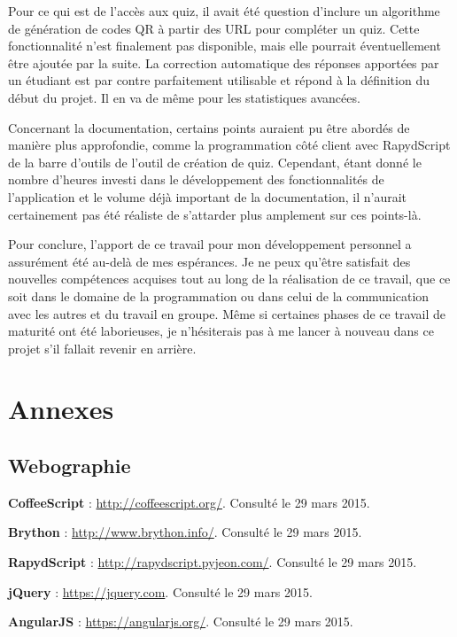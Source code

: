 \documentclass[a4,10pt,french]{sphinxmanual}
\begin{document}
Pour ce qui est de l'accès aux quiz, il avait été question d'inclure un algorithme
de génération de codes QR à partir des URL pour compléter un quiz. Cette fonctionnalité
n'est finalement pas disponible, mais elle pourrait éventuellement être ajoutée par la suite.
La correction automatique des réponses apportées par un étudiant est par contre
parfaitement utilisable et répond à la définition du début du projet. Il en va de même
pour les statistiques avancées.

Concernant la documentation, certains points auraient pu être abordés de manière
plus approfondie, comme la programmation côté client avec RapydScript de la barre
d'outils de l'outil de création de quiz. Cependant, étant donné le nombre d'heures
investi dans le développement des fonctionnalités de l'application et le volume
déjà important de la documentation, il n'aurait certainement pas été réaliste de
s'attarder plus amplement sur ces points-là.

Pour conclure, l'apport de ce travail pour mon développement personnel a assurément
été au-delà de mes espérances. Je ne peux qu'être satisfait des nouvelles compétences acquises
tout au long de la réalisation de ce travail, que ce soit dans le domaine de la programmation
ou dans celui de la communication avec les autres et du travail en groupe. Même si certaines
phases de ce travail de maturité ont été laborieuses, je n'hésiterais pas à me lancer
à nouveau dans ce projet s'il fallait revenir en arrière.


\chapter{Annexes}
\label{end::doc}\label{end:annexes}

\section{Webographie}
\label{end:webographie}
\textbf{CoffeeScript} : \href{http://coffeescript.org/}{http://coffeescript.org/}. Consulté le 29 mars 2015.

\textbf{Brython} : \href{http://www.brython.info/}{http://www.brython.info/}. Consulté le 29 mars 2015.

\textbf{RapydScript} : \href{http://rapydscript.pyjeon.com/}{http://rapydscript.pyjeon.com/}. Consulté le 29 mars 2015.

\textbf{jQuery} : \href{https://jquery.com}{https://jquery.com}. Consulté le 29 mars 2015.

\textbf{AngularJS} : \href{https://angularjs.org/}{https://angularjs.org/}. Consulté le 29 mars 2015.
\end{document}
